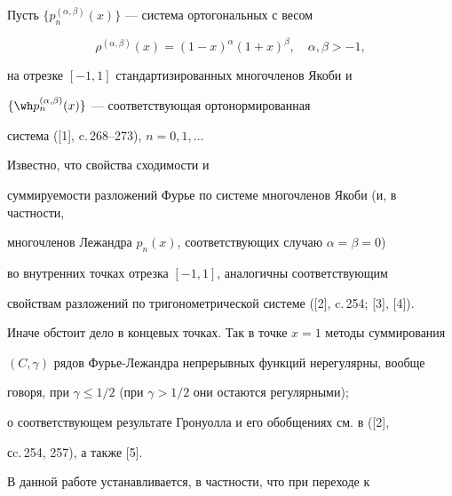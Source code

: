 \date{}




\pagestyle{plain} %







\maketitle


\label{begin}





Пусть $\{p_n^{(\alpha,\beta)} (x)\}$ --- система ортогональных с весом


$$


\rho^{(\alpha,\beta)} (x)=(1-x)^\alpha (1+x)^\beta,\quad \alpha,\beta >-1,


$$


на отрезке $[-1,1]$ стандартизированных многочленов Якоби и


$\{\wh p_n^{(\alpha,\beta)}(x)\}$ --- соответствующая ортонормированная


система ([1], c.\,268--273), $n=0,1,\dotsc$


Известно, что свойства сходимости и


суммируемости разложений Фурье по системе многочленов Якоби (и, в частности,


многочленов Лежандра $p_n(x)$, соответствующих случаю $\alpha=\beta=0$)


во внутренних точках отрезка $[-1,1]$, аналогичны соответствующим


свойствам разложений по тригонометрической системе ([2], c.\,254; [3], [4]).


Иначе обстоит дело в концевых точках. Так в точке $x=1$ методы суммирования


$(C,\gamma)$ рядов Фурье-Лежандра непрерывных функций нерегулярны, вообще


говоря, при $\gamma \le 1/2$ (при $\gamma > 1/2$ они остаются регулярными);


о соответствующем результате Гронуолла и его обобщениях см. в ([2],


сc.\,254, 257), а также [5].





В данной работе устанавливается, в частности, что при переходе к


